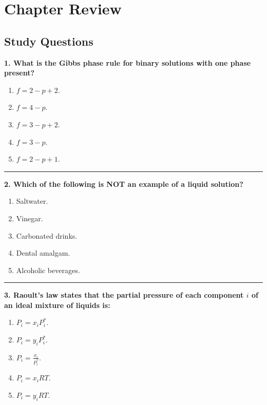 \documentclass[
  9pt,
]{extbook}
\providecommand{\tightlist}{%
  \setlength{\itemsep}{0pt}\setlength{\parskip}{0pt}}
\theoremstyle{definition}
\theoremstyle{definition}
\theoremstyle{definition}
\theoremstyle{remark}
\begin{document}
\hypertarget{rev13}{%
\section{Chapter Review}\label{rev13}}

\hypertarget{quest13}{%
\subsection{Study Questions}\label{quest13}}

\textbf{1. What is the Gibbs phase rule for binary solutions with one phase present?}

\begin{enumerate}
\def\labelenumi{\alph{enumi}.}
\tightlist
\item
  \(f = 2 - p + 2\).
\item
  \(f = 4 - p\).
\item
  \(f = 3 - p + 2\).
\item
  \(f = 3 - p\).
\item
  \(f = 2 - p + 1\).
\end{enumerate}

\begin{center}\rule{0.5\linewidth}{0.5pt}\end{center}

\textbf{2. Which of the following is NOT an example of a liquid solution?}

\begin{enumerate}
\def\labelenumi{\alph{enumi}.}
\tightlist
\item
  Saltwater.
\item
  Vinegar.
\item
  Carbonated drinks.
\item
  Dental amalgam.
\item
  Alcoholic beverages.
\end{enumerate}

\begin{center}\rule{0.5\linewidth}{0.5pt}\end{center}

\textbf{3. Raoult's law states that the partial pressure of each component \(i\) of an ideal mixture of liquids is:}

\begin{enumerate}
\def\labelenumi{\alph{enumi}.}
\tightlist
\item
  \(P_i = x_i P^*_i\).
\item
  \(P_i = y_i P^*_i\).
\item
  \(P_i = \frac{x_i}{P^*_i}\).
\item
  \(P_i = x_i RT\).
\item
  \(P_i = y_i RT\).
\end{enumerate}
\end{document}
